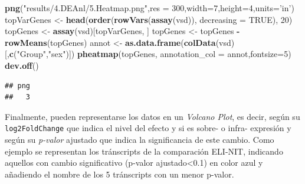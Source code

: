 \documentclass[
]{article}
\newenvironment{Shaded}{\begin{snugshade}}{\end{snugshade}}
\newcommand{\DataTypeTok}[1]{\textcolor[rgb]{0.13,0.29,0.53}{#1}}
\newcommand{\DecValTok}[1]{\textcolor[rgb]{0.00,0.00,0.81}{#1}}
\newcommand{\KeywordTok}[1]{\textcolor[rgb]{0.13,0.29,0.53}{\textbf{#1}}}
\newcommand{\NormalTok}[1]{#1}
\newcommand{\OperatorTok}[1]{\textcolor[rgb]{0.81,0.36,0.00}{\textbf{#1}}}
\newcommand{\OtherTok}[1]{\textcolor[rgb]{0.56,0.35,0.01}{#1}}
\newcommand{\StringTok}[1]{\textcolor[rgb]{0.31,0.60,0.02}{#1}}
\begin{document}
\begin{Shaded}
\begin{Highlighting}[]
\KeywordTok{png}\NormalTok{(}\StringTok{"results/4.DEAnl/5.Heatmap.png"}\NormalTok{,}\DataTypeTok{res =} \DecValTok{300}\NormalTok{,}\DataTypeTok{width=}\DecValTok{7}\NormalTok{,}\DataTypeTok{height=}\DecValTok{4}\NormalTok{,}\DataTypeTok{units=}\StringTok{'in'}\NormalTok{)}
\NormalTok{topVarGenes <-}\StringTok{ }\KeywordTok{head}\NormalTok{(}\KeywordTok{order}\NormalTok{(}\KeywordTok{rowVars}\NormalTok{(}\KeywordTok{assay}\NormalTok{(vsd)), }\DataTypeTok{decreasing =} \OtherTok{TRUE}\NormalTok{), }\DecValTok{20}\NormalTok{)}
\NormalTok{topGenes <-}\StringTok{ }\KeywordTok{assay}\NormalTok{(vsd)[topVarGenes, ]}
\NormalTok{topGenes <-}\StringTok{ }\NormalTok{topGenes }\OperatorTok{-}\StringTok{ }\KeywordTok{rowMeans}\NormalTok{(topGenes)}
\NormalTok{annot <-}\StringTok{ }\KeywordTok{as.data.frame}\NormalTok{(}\KeywordTok{colData}\NormalTok{(vsd)[,}\KeywordTok{c}\NormalTok{(}\StringTok{"Group"}\NormalTok{,}\StringTok{"sex"}\NormalTok{)])}
\KeywordTok{pheatmap}\NormalTok{(topGenes, }\DataTypeTok{annotation_col =}\NormalTok{ annot,}\DataTypeTok{fontsize=}\DecValTok{5}\NormalTok{)}
\KeywordTok{dev.off}\NormalTok{()}
\end{Highlighting}
\end{Shaded}

\begin{verbatim}
## png 
##   3
\end{verbatim}

Finalmente, pueden representarse los datos en un \emph{Volcano Plot}, es
decir, según su \texttt{log2FoldChange} que indica el nivel del efecto y
si es sobre- o infra- expresión y según su \emph{p-valor} ajustado que
indica la significancia de este cambio. Como ejemplo se representan los
tránscripts de la comparación ELI-NIT, indicando aquellos con cambio
significativo (p-valor ajustado\textless0.1) en color azul y añadiendo
el nombre de los 5 tránscripts con un menor p-valor.
\end{document}

